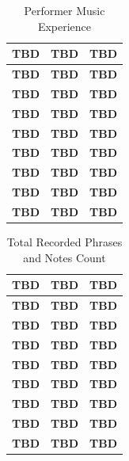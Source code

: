 \begin{table}[bp]
   \centering
   \caption{Performer Music Experience}
   \label{tab:performer}
   \begin{tabular}{lrr}
      \hline
      \textbf{TBD} & \textbf{TBD} & \textbf{TBD}\\
      \hline
      \textbf{TBD} & \textbf{TBD} & \textbf{TBD}\\
      \hline
      \textbf{TBD} & \textbf{TBD} & \textbf{TBD}\\
      \hline
      \textbf{TBD} & \textbf{TBD} & \textbf{TBD}\\
      \hline
      \textbf{TBD} & \textbf{TBD} & \textbf{TBD}\\
      \hline
      \textbf{TBD} & \textbf{TBD} & \textbf{TBD}\\
      \hline
      \textbf{TBD} & \textbf{TBD} & \textbf{TBD}\\
      \hline
      \textbf{TBD} & \textbf{TBD} & \textbf{TBD}\\
      \hline
      \textbf{TBD} & \textbf{TBD} & \textbf{TBD}\\
      \hline
   \end{tabular}
\end{table}
\begin{table}[bp]
   \centering
   \caption{Total Recorded Phrases and Notes Count}
   \label{tab:corpuscount}
   \begin{tabular}{lrr}
      \hline
      \textbf{TBD} & \textbf{TBD} & \textbf{TBD}\\
      \hline
      \textbf{TBD} & \textbf{TBD} & \textbf{TBD}\\
      \hline
      \textbf{TBD} & \textbf{TBD} & \textbf{TBD}\\
      \hline
      \textbf{TBD} & \textbf{TBD} & \textbf{TBD}\\
      \hline
      \textbf{TBD} & \textbf{TBD} & \textbf{TBD}\\
      \hline
      \textbf{TBD} & \textbf{TBD} & \textbf{TBD}\\
      \hline
      \textbf{TBD} & \textbf{TBD} & \textbf{TBD}\\
      \hline
      \textbf{TBD} & \textbf{TBD} & \textbf{TBD}\\
      \hline
      \textbf{TBD} & \textbf{TBD} & \textbf{TBD}\\
      \hline
   \end{tabular}
\end{table}


